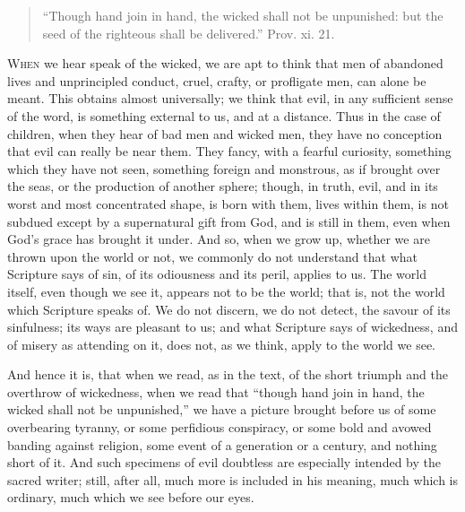 
\begin{quote}

``Though hand join in hand, the wicked shall not be
unpunished: but the seed of the righteous shall be delivered.''
Prov. xi. 21.

\end{quote}

W\textsc{hen} we hear speak of the wicked, we are apt to think that men of
abandoned lives and unprincipled conduct, cruel, crafty, or profligate
men, can alone be meant. This obtains almost universally; we think
that evil, in any sufficient sense of the word, is something external
to us, and at a distance. Thus in the case of children, when they hear
of bad men and wicked men, they have no conception that evil can
really be near them. They fancy, with a fearful curiosity, something
which they have not seen, something foreign and monstrous, as if
brought over the seas, or the production of another sphere; though, in
truth, evil, and in its worst and most concentrated shape, is born
with them, lives within them, is not subdued except by a supernatural
gift from God, and is still in them, even when God's grace has brought
it under. And so, when we grow up, whether we are thrown upon the
world or not, we commonly do not understand that what Scripture says
of sin, of its odiousness and its peril, applies to us. The world
itself, even though we see it, appears not to be the world; that is,
not the world which Scripture speaks of. We do not discern, we do not
detect, the savour of its sinfulness; its ways are pleasant to us; and
what Scripture says of wickedness, and of misery as attending on it,
does not, as we think, apply to the world we see.

And hence it is, that when we read, as in the text, of the short
triumph and the overthrow of wickedness, when we read that
``though hand join in hand, the wicked shall not be
unpunished,'' we have a picture brought before us of some
overbearing tyranny, or some perfidious conspiracy, or some bold and
avowed banding against religion, some event of a generation or a
century, and nothing short of it. And such specimens of evil doubtless
are especially intended by the sacred writer; still, after all, much
more is included in his meaning, much which is ordinary, much which we
see before our eyes.

